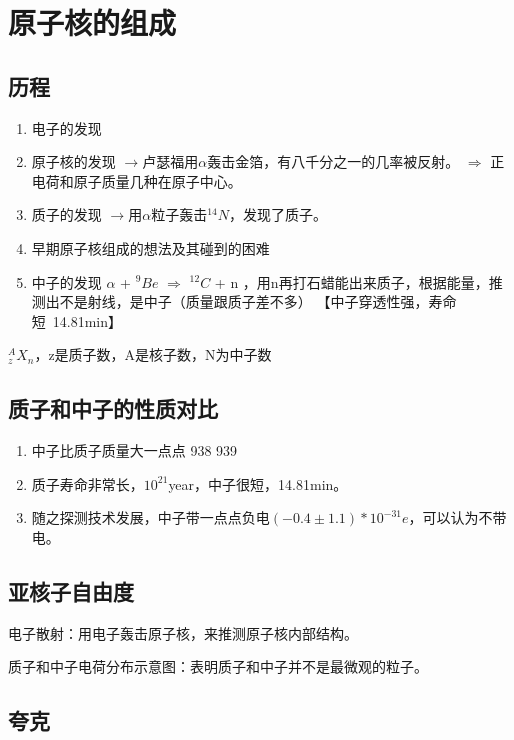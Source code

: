 \chapter{原子核的组成}

\section{历程} 

\begin{enumerate}
    \item 电子的发现 
    \item 原子核的发现 $\rightarrow$卢瑟福用$\alpha$轰击金箔，有八千分之一的几率被反射。 $\Rightarrow$ 正电荷和原子质量几种在原子中心。
    \item 质子的发现 $\rightarrow$用$\alpha$粒子轰击$^{14}N$，发现了质子。
    \item 早期原子核组成的想法及其碰到的困难
    \item 中子的发现 $\alpha$ + $^{9}Be$ $\Rightarrow$ $^{12}C$ + n  ，用n再打石蜡能出来质子，根据能量，推测出不是射线，是中子（质量跟质子差不多）  【中子穿透性强，寿命短~14.81min】
\end{enumerate}

$_{z}^{A}X_{n}$，z是质子数，A是核子数，N为中子数

\section{质子和中子的性质对比} 

\begin{enumerate}
    \item 中子比质子质量大一点点  938  939
    \item 质子寿命非常长，$10^21$year，中子很短，14.81min。
    \item 随之探测技术发展，中子带一点点负电$(-0.4\pm 1.1)*10^{-31}e$，可以认为不带电。
\end{enumerate}

\section{亚核子自由度}

电子散射：用电子轰击原子核，来推测原子核内部结构。

质子和中子电荷分布示意图：表明质子和中子并不是最微观的粒子。

\section{夸克}


